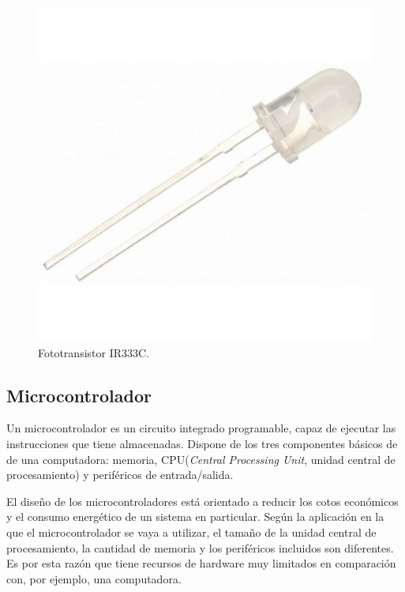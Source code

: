 	\begin{figure}[h]
		\centering
		\includegraphics[scale=0.3]{./Figures/phototransistor.jpg}
		\caption{Fototransistor IR333C\protect\footnotemark.}
		\label{fig:cuadradoAzul}
	\end{figure}


\subsection{Microcontrolador}

Un microcontrolador es un circuito integrado programable, capaz de ejecutar las instrucciones que tiene almacenadas. Dispone de los tres componentes básicos de de una computadora: memoria, CPU(\textit{Central Processing Unit}, unidad central de procesamiento) y periféricos de entrada/salida. 

El diseño de los microcontroladores está orientado a reducir los cotos económicos y el consumo energético de un sistema en particular. Según la aplicación en la que el microcontrolador se vaya a utilizar, el tamaño de la unidad central de procesamiento, la cantidad de memoria y los periféricos incluidos son diferentes. Es por esta razón que tiene recursos de hardware muy limitados en comparación con, por ejemplo, una computadora.

